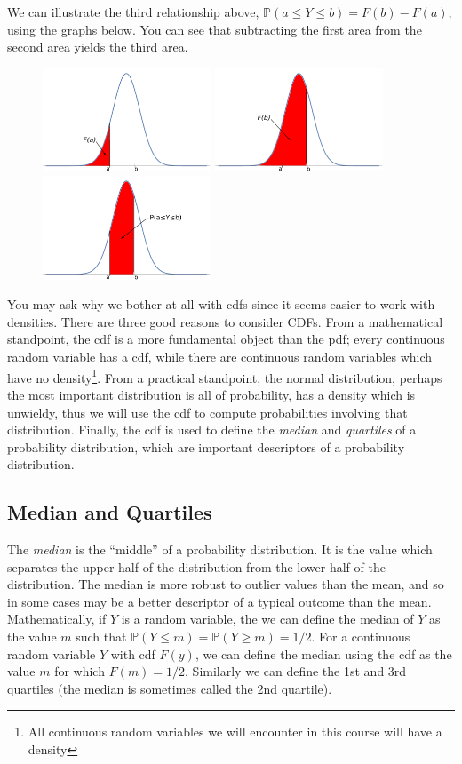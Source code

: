 \documentclass[12pt]{article}
\theoremstyle{definition}
\theoremstyle{remark}
\def\P{{\mathbb P}}
\begin{document}
We can illustrate the third relationship above, $\P(a \leq Y \leq b) = F(b) - F(a)$, using the graphs below. You can see that subtracting the first area from the second area yields the third area.
\begin{figure}[H]
\centering
\includegraphics[width=5cm]{normalcdfFa.pdf}
\includegraphics[width=5cm]{normalcdfFb.pdf}
\includegraphics[width=5cm]{normalcdfPab.pdf}
\end{figure}

You may ask why we bother at all with cdfs since it seems easier to work with densities. There are three good reasons to consider CDFs. From a mathematical standpoint, the cdf is a more fundamental object than the pdf; every continuous random variable has a cdf, while there are continuous random variables which have no density\footnote{All continuous random variables we will encounter in this course will have a density}. From a practical standpoint, the normal distribution, perhaps the most important distribution is all of probability, has a density which is unwieldy, thus we will use the cdf to compute probabilities involving that distribution. Finally, the cdf is used to define the \emph{median} and \emph{quartiles} of a probability distribution, which are important descriptors of a probability distribution.

\subsection{Median and Quartiles}
The \emph{median} is the ``middle'' of a probability distribution. It is the value which separates the upper half of the distribution from the lower half of the distribution. The median is more robust to outlier values than the mean, and so in some cases may be a better descriptor of a typical outcome than the mean. Mathematically, if $Y$ is a random variable, the we can define the median of $Y$ as the value $m$ such that $\P(Y \leq m) = \P(Y \geq m) = 1/2$. For a continuous random variable $Y$ with cdf $F(y)$, we can define the median using the cdf as the value $m$ for which $F(m) = 1/2$. Similarly we can define the 1st and 3rd quartiles (the median is sometimes called the 2nd quartile). 
\end{document}
